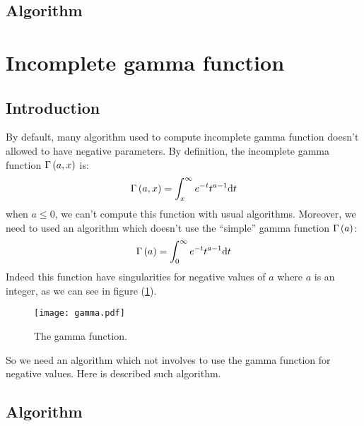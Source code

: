 \subsection{Algorithm}
%
\section{Incomplete gamma function}
%
\subsection{Introduction}
%
By default, many algorithm used to compute incomplete gamma function doesn't
allowed to have negative parameters. By definition, the incomplete gamma
function $\Gamma\left({a,x}\right)$ is:
%
\begin{equation}
    \Gamma\left({a,x}\right)=\int_x^\infty{e^{-t}{t^{a-1}}{\rm{d}}{t}}
\end{equation}
%
when $a\leq0$, we can't compute this function with usual algorithms. Moreover,
we need to used an algorithm which doesn't use the ``simple'' gamma function
$\Gamma\left({a}\right)$:
%
\begin{equation}
    \Gamma\left({a}\right)=\int_0^\infty{e^{-t}{t^{a-1}}{\rm{d}}{t}}
\end{equation}
%
Indeed this function have singularities for negative values of $a$ where $a$ is
an integer, as we can see in figure (\ref{fig:gamma}).
%
\begin{figure}[hbtp]
    \centering
    \texttt{[image: gamma.pdf]}
    \caption{\footnotesize{}The gamma function.}
\label{fig:gamma}
\end{figure}
%
So we need an algorithm which not involves to use the gamma function for
negative values. Here is described such algorithm.
%
\subsection{Algorithm}
%

